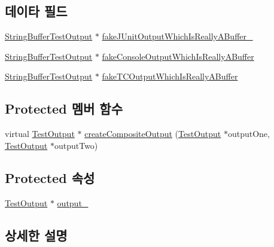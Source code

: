 \subsection*{데이타 필드}
\begin{DoxyCompactItemize}
\item 
\hyperlink{class_string_buffer_test_output}{String\+Buffer\+Test\+Output} $\ast$ \hyperlink{class_command_line_test_runner_with_string_buffer_output_a0b64331a57dbb7e8ffc4b37be8e8e7cf}{fake\+J\+Unit\+Output\+Which\+Is\+Really\+A\+Buffer\+\_\+}
\item 
\hyperlink{class_string_buffer_test_output}{String\+Buffer\+Test\+Output} $\ast$ \hyperlink{class_command_line_test_runner_with_string_buffer_output_a52917ab85c94613a437c1f4956081925}{fake\+Console\+Output\+Which\+Is\+Really\+A\+Buffer}
\item 
\hyperlink{class_string_buffer_test_output}{String\+Buffer\+Test\+Output} $\ast$ \hyperlink{class_command_line_test_runner_with_string_buffer_output_a8b0ea122b56347852ccaedf312b9cfe6}{fake\+T\+C\+Output\+Which\+Is\+Really\+A\+Buffer}
\end{DoxyCompactItemize}
\subsection*{Protected 멤버 함수}
\begin{DoxyCompactItemize}
\item 
virtual \hyperlink{class_test_output}{Test\+Output} $\ast$ \hyperlink{class_command_line_test_runner_aef197cf30b468250d094d829804333f5}{create\+Composite\+Output} (\hyperlink{class_test_output}{Test\+Output} $\ast$output\+One, \hyperlink{class_test_output}{Test\+Output} $\ast$output\+Two)
\end{DoxyCompactItemize}
\subsection*{Protected 속성}
\begin{DoxyCompactItemize}
\item 
\hyperlink{class_test_output}{Test\+Output} $\ast$ \hyperlink{class_command_line_test_runner_ae15a8129794917933fb12ba1e4e6de6f}{output\+\_\+}
\end{DoxyCompactItemize}


\subsection{상세한 설명}


